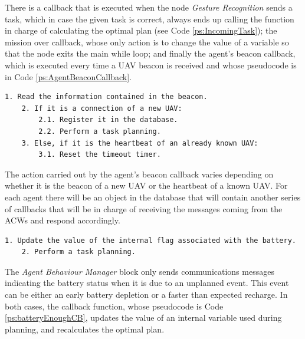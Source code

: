 \documentclass[fontsize=11pt, English=false, Español=true, Myfinal=true, twoside, numbers=noenddot]{scrbook}
\begin{document}
{There is a callback that is executed when the node \emph{Gesture Recognition} sends a task, which in case the given task is correct, always ends up calling the function in charge of calculating the optimal plan (see Code \ref{ps:IncomingTask}); the mission over callback, whose only action is to change the value of a variable so that the node exits the main while loop; and finally the agent's beacon callback, which is executed every time a \gls{UAV} beacon is received and whose pseudocode is in Code \ref{ps:AgentBeaconCallback}.

\begin{lstlisting}[caption={Agent's beacon callback}, breaklines=true, label=ps:AgentBeaconCallback]
	1. Read the information contained in the beacon.
	2. If it is a connection of a new UAV:
		2.1. Register it in the database.
		2.2. Perform a task planning.
	3. Else, if it is the heartbeat of an already known UAV:
		3.1. Reset the timeout timer.
\end{lstlisting}

The action carried out by the agent's beacon callback varies depending on whether it is the beacon of a new \gls{UAV} or the heartbeat of a known \gls{UAV}. For each agent there will be an object in the database that will contain another series of callbacks that will be in charge of receiving the messages coming from the \glspl{ACW} and respond accordingly.

\begin{lstlisting}[caption={Callback that runs when an \emph{Agent Behaviour Manager} sends battery feedback}, breaklines=true, label=ps:batteryEnoughCB]
	1. Update the value of the internal flag associated with the battery.
	2. Perform a task planning.
\end{lstlisting}

The \emph{Agent Behaviour Manager} block only sends communications messages indicating the battery status when it is due to an unplanned event. This event can be either an early battery depletion or a faster than expected recharge. In both cases, the callback function, whose pseudocode is Code \ref{ps:batteryEnoughCB}, updates the value of an internal variable used during planning, and recalculates the optimal plan.

}
\end{document}
